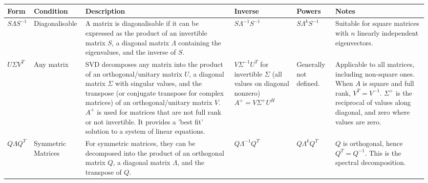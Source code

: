 \begin{table}[h!]
\centering
\begin{tabular}{>{\centering\arraybackslash}m{1.5cm} >{\centering\arraybackslash}m{2cm} >{\centering\arraybackslash}m{4cm} >{\centering\arraybackslash}m{2cm} >{\centering\arraybackslash}m{2cm} >{\centering\arraybackslash}m{3cm}}
\toprule
\textbf{Form} & \textbf{Condition} & \textbf{Description} & \textbf{Inverse} & \textbf{Powers} & \textbf{Notes} \\
\midrule
\( S \Lambda S^{-1} \) & Diagonalisable & A matrix is diagonalisable if it can be expressed as the product of an invertible matrix \( S \), a diagonal matrix \( \Lambda \) containing the eigenvalues, and the inverse of \( S \). & \( S \Lambda^{-1} S^{-1} \) & \( S \Lambda^k S^{-1} \) & Suitable for square matrices with \( n \) linearly independent eigenvectors. \\
\addlinespace
\( U \Sigma V^T \) & Any matrix & SVD decomposes any matrix into the product of an orthogonal/unitary matrix \( U \), a diagonal matrix \( \Sigma \) with singular values, and the transpose (or conjugate transpose for complex matrices) of an orthogonal/unitary matrix \( V \). $A^+$ is used for matrices that are not full rank or not invertible. It provides a 'best fit' solution to a system of linear equations. & \( V \Sigma^{-1} U^T \) for invertible \( \Sigma \) (all values on diagonal nonzero) \( A^+ = V \Sigma^+ U^H \) & Generally not defined. & Applicable to all matrices, including non-square ones. When \( A \) is square and full rank, \( V^T = V^{-1} \). $\Sigma^+$ is the reciprocal of values along diagonal, and zero where values are zero. \\
\addlinespace
\( Q \Lambda Q^T \) & Symmetric Matrices & For symmetric matrices, they can be decomposed into the product of an orthogonal matrix \( Q \), a diagonal matrix \( \Lambda \), and the transpose of \( Q \). & \( Q \Lambda^{-1} Q^T \) & \( Q \Lambda^k Q^T \) & \( Q \) is orthogonal, hence \( Q^T = Q^{-1} \). This is the spectral decomposition. \\

\end{tabular}
\end{table}

